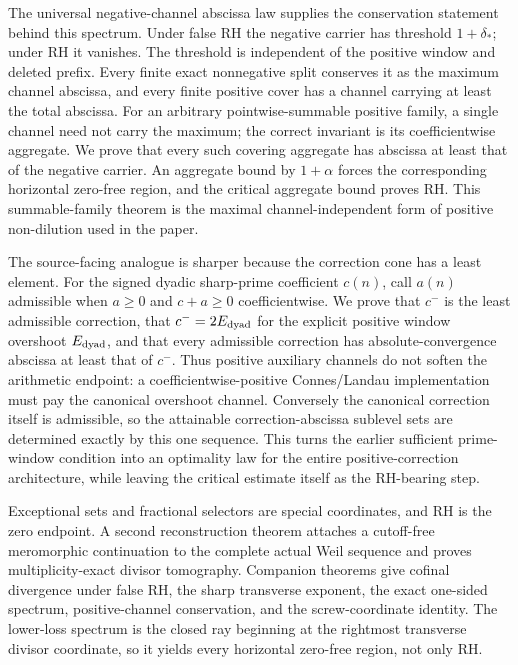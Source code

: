 \documentclass[11pt]{article}
\begin{document}
The universal negative-channel abscissa law supplies the conservation statement behind this
spectrum.  Under false RH the negative carrier has threshold $1+\delta_*$; under RH it vanishes.
The threshold is independent of the positive window and deleted prefix.  Every finite exact
nonnegative split conserves it as the maximum channel abscissa, and every finite positive cover
has a channel carrying at least the total abscissa.  For an arbitrary pointwise-summable positive
family, a single channel need not carry the maximum; the correct invariant is its coefficientwise
aggregate.  We prove that every such covering aggregate has abscissa at least that of the negative
carrier.  An aggregate bound by $1+\alpha$ forces the corresponding horizontal zero-free region,
and the critical aggregate bound proves RH.  This summable-family theorem is the maximal
channel-independent form of positive non-dilution used in the paper.

The source-facing analogue is sharper because the correction cone has a least element.  For the
signed dyadic sharp-prime coefficient $c(n)$, call $a(n)$ admissible when $a\ge0$ and $c+a\ge0$
coefficientwise.  We prove that $c^-$ is the least admissible correction, that
$c^-=2E_{\rm dyad}$ for the explicit positive window overshoot $E_{\rm dyad}$, and that every admissible correction
has absolute-convergence abscissa at least that of $c^-$.  Thus positive auxiliary channels do
not soften the arithmetic endpoint: a coefficientwise-positive Connes/Landau implementation
must pay the canonical overshoot channel.  Conversely the canonical correction itself is
admissible, so the attainable correction-abscissa sublevel sets are determined exactly by this
one sequence.  This turns the earlier sufficient prime-window condition into an optimality law
for the entire positive-correction architecture, while leaving the critical estimate itself as
the RH-bearing step.

Exceptional sets and fractional selectors are special coordinates, and RH is the zero endpoint.
A second reconstruction theorem attaches a cutoff-free meromorphic continuation to the complete
actual Weil sequence and proves multiplicity-exact divisor tomography.  Companion theorems give
cofinal divergence under false RH, the sharp transverse exponent, the exact one-sided spectrum,
positive-channel conservation, and the screw-coordinate identity.  The lower-loss spectrum is
the closed ray beginning at the rightmost transverse divisor coordinate, so it yields every
horizontal zero-free region, not only RH.
\end{document}
